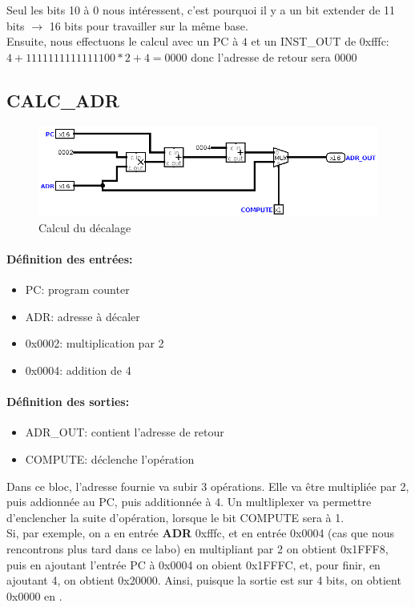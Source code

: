 \documentclass[a4paper]{article} %
\begin{document}
    \medskip
Seul les bits 10 à 0 nous intéressent, c'est pourquoi il y a un bit extender de 11 bits $\rightarrow$ 16 bits pour travailler sur la même base.\\
Ensuite, nous effectuons le calcul avec un PC à $4$ et un INST\_OUT de 0xfffc: $4 + 1111111111111100 * 2 + 4=0000$ donc l'adresse de retour sera $0000$

\subsection{CALC\_ADR} \label{bl_calc_adr}
\begin{figure}[H]
    \centering
    \includegraphics[width=.8\textwidth]{src/CALC_ADR.png}
    \caption{Calcul du décalage}
    \label{bl_calc_adr}
\end{figure}
\paragraph{Définition des entrées:}
\begin{itemize}
    \item     PC: program counter
    \item     ADR: adresse à décaler
    \item     0x0002: multiplication par 2
    \item     0x0004: addition de 4
\end{itemize}

\paragraph{Définition des sorties:}
\begin{itemize}
    \item ADR\_OUT: contient l'adresse de retour
    \item COMPUTE: déclenche l'opération
\end{itemize}
\medskip
Dans ce bloc, l'adresse fournie va subir 3 opérations. Elle va être multipliée par 2, puis addionnée au PC, puis additionnée à 4. Un multliplexer va permettre d'enclencher la suite d'opération, lorsque le bit COMPUTE sera à 1.
\\
Si, par exemple, on a en entrée \textbf{ADR} 0xfffc, et en entrée  0x0004 (cas que nous rencontrons plus tard dans ce labo) en multipliant par 2 on obtient 0x1FFF8, puis en ajoutant l'entrée PC à 0x0004 on obient 0x1FFFC, et, pour finir, en ajoutant 4, on obtient 0x20000. Ainsi, puisque la sortie est sur 4 bits, on obtient 0x0000 en .
\end{document}
